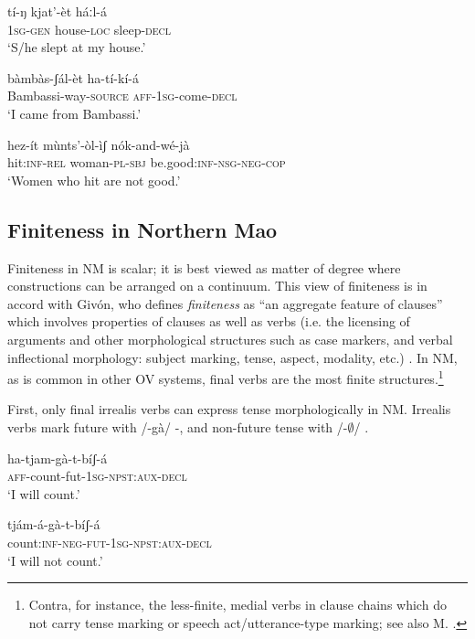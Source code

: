 \documentclass[output=paper]{langsci/langscibook}
\begin{document}
\ea\label{ex:mahland:2}
\gll tí-ŋ           {\downstep}kjat'-èt        háːl-{\downstep}á\\
1\textsc{sg}{}-\textsc{gen}   house-\textsc{loc}   sleep-\textsc{decl} \\
\glt `S/he slept at my house.'
\z

\ea\label{ex:mahland:3}
\gll bàmbàs-ʃál-èt                 ha-tí-kí-{\downstep}á  \\
Bambassi-way-\textsc{source}    \textsc{aff}{}-1\textsc{sg}{}-come-\textsc{decl}\\
\glt `I came from Bambassi.'
\z

\ea\label{ex:mahland:4}
\gll hez-ít           mùnts'-òl-ìʃ      nók-and-wé-jà\\
hit:\textsc{inf-rel}   woman-\textsc{pl-sbj}  be.good:\textsc{inf-nsg-neg-cop}\\
\glt `Women who hit are not good.'
\z

\subsection{Finiteness in Northern Mao}\label{sec:mahland:1.2}

Finiteness in NM is scalar; it is best viewed as matter of degree where constructions can be arranged on a continuum. This view of finiteness is in accord with Givón, who defines \textit{finiteness} as ``an aggregate feature of clauses'' which involves properties of clauses as well as verbs (i.e. the licensing of arguments and other morphological structures such as case markers, and verbal inflectional morphology: subject marking, tense, aspect, modality, etc.) \citep[25]{Givon2001-2}. In NM, as is common in other OV systems, final verbs are the most finite structures.\footnote{Contra, for instance, the less-finite, medial verbs in clause chains which do not carry tense marking or speech act/utterance-type marking; see also M. \citet[559]{Ahland2012}.} 

First, only final irrealis verbs can express tense morphologically in NM. Irrealis verbs mark future with /-gà/ -, and non-future tense with /-${\emptyset}$/ .

\ea\label{ex:mahland:5}
\gll ha-tjam-gà-t-bíʃ-á\\
\textsc{aff}{}-count-fut-\textsc{1sg-npst:aux-decl} \\
\glt `I will count.' 
\z

\ea\label{ex:mahland:6}
\gll tjám-á-gà-t-bíʃ-á   \\
count:\textsc{inf-neg-fut-1sg-npst:aux-decl} \\
\glt `I will not count.'
\z
\end{document}
